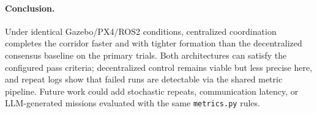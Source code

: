 \documentclass[a4paper,11pt]{article}
\begin{document}
\paragraph{Conclusion.}
Under identical Gazebo/PX4/ROS2 conditions, centralized coordination completes the corridor faster and with tighter formation than the decentralized consensus baseline on the primary trials. Both architectures can satisfy the configured pass criteria; decentralized control remains viable but less precise here, and repeat logs show that failed runs are detectable via the shared metric pipeline. Future work could add stochastic repeats, communication latency, or LLM-generated missions evaluated with the same \texttt{metrics.py} rules.



\end{document}
